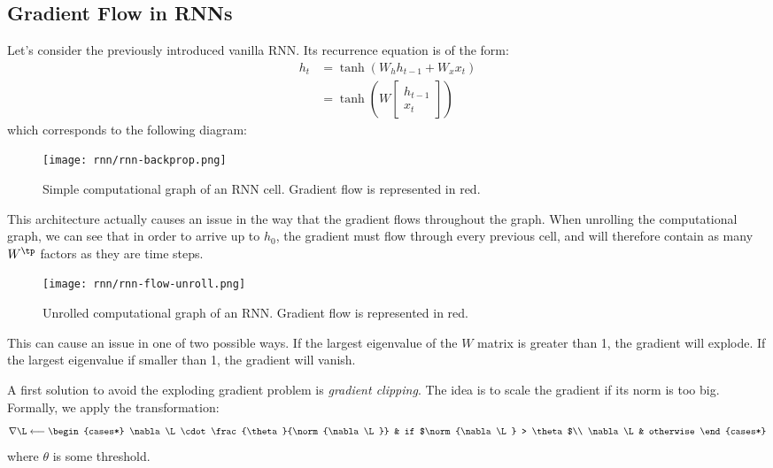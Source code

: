 \subsection{Gradient Flow in RNNs}
Let's consider the previously introduced vanilla RNN. Its recurrence equation is of the form:
\begin{equation*}
    \begin{aligned}
        h_t &= \tanh\left(W_hh_{t-1}+W_xx_t\right)\\
        &= \tanh\left(W\begin{bmatrix}
            h_{t-1}\\
            x_t
        \end{bmatrix}\right)
    \end{aligned}
\end{equation*}
which corresponds to the following diagram:
\begin{figure}[H]
    \centering
    \texttt{[image: rnn/rnn-backprop.png]}
    \caption{Simple computational graph of an RNN cell. Gradient flow is represented in red.}
\end{figure}
This architecture actually causes an issue in the way that the gradient flows throughout the graph. When unrolling the computational graph, we can see that in order to arrive up to $h_0$, the gradient must flow through every previous cell, and will therefore contain as many $W^\tp$ factors as they are time steps.
\begin{figure}[H]
    \centering
    \texttt{[image: rnn/rnn-flow-unroll.png]}
    \caption{Unrolled computational graph of an RNN. Gradient flow is represented in red.}
\end{figure}
This can cause an issue in one of two possible ways. If the largest eigenvalue of the $W$ matrix is greater than 1, the gradient will explode. If the largest eigenvalue if smaller than 1, the gradient will vanish.

A first solution to avoid the exploding gradient problem is \emph{gradient clipping}. The idea is to scale the gradient if its norm is too big. Formally, we apply the transformation:
\begin{equation*}
    \nabla\L \longleftarrow \begin{cases*}
        \nabla\L \cdot \frac{\theta}{\norm{\nabla\L}} & if $\norm{\nabla\L} > \theta$\\
        \nabla\L & otherwise
    \end{cases*}
\end{equation*}
where $\theta$ is some threshold.

